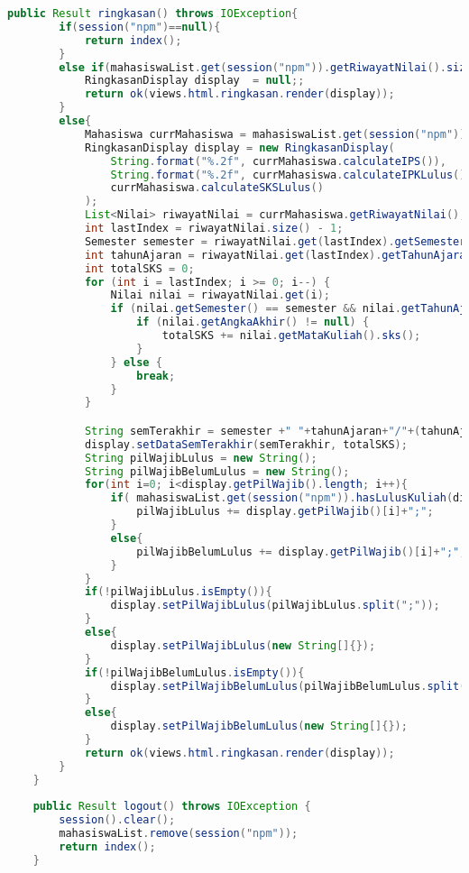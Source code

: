 \begin{lstlisting}[language=Java,basicstyle=\tiny,caption=Application.java]
    public Result ringkasan() throws IOException{
    	if(session("npm")==null){
    		return index();
    	}
    	else if(mahasiswaList.get(session("npm")).getRiwayatNilai().size()==0){
    		RingkasanDisplay display  = null;;
	    	return ok(views.html.ringkasan.render(display));
    	}
    	else{
    		Mahasiswa currMahasiswa = mahasiswaList.get(session("npm"));
    		RingkasanDisplay display = new RingkasanDisplay(
				String.format("%.2f", currMahasiswa.calculateIPS()), 
				String.format("%.2f", currMahasiswa.calculateIPKLulus()), 
				currMahasiswa.calculateSKSLulus()
			);
	    	List<Nilai> riwayatNilai = currMahasiswa.getRiwayatNilai();	
	    	int lastIndex = riwayatNilai.size() - 1;
			Semester semester = riwayatNilai.get(lastIndex).getSemester();
			int tahunAjaran = riwayatNilai.get(lastIndex).getTahunAjaran();
			int totalSKS = 0;
			for (int i = lastIndex; i >= 0; i--) {
				Nilai nilai = riwayatNilai.get(i);
				if (nilai.getSemester() == semester && nilai.getTahunAjaran() == tahunAjaran) {
					if (nilai.getAngkaAkhir() != null) {
						totalSKS += nilai.getMataKuliah().sks();
					}
				} else {
					break;
				}
			}

			String semTerakhir = semester +" "+tahunAjaran+"/"+(tahunAjaran+1);
	    	display.setDataSemTerakhir(semTerakhir, totalSKS);
    		String pilWajibLulus = new String();
	    	String pilWajibBelumLulus = new String();
    		for(int i=0; i<display.getPilWajib().length; i++){
	    		if( mahasiswaList.get(session("npm")).hasLulusKuliah(display.getPilWajib()[i])){
	    			pilWajibLulus += display.getPilWajib()[i]+";";
	    		}
	    		else{
	    			pilWajibBelumLulus += display.getPilWajib()[i]+";";
	    		}
	    	}
    		if(!pilWajibLulus.isEmpty()){
	    		display.setPilWajibLulus(pilWajibLulus.split(";"));
    		}
    		else{
    			display.setPilWajibLulus(new String[]{});
    		}
    		if(!pilWajibBelumLulus.isEmpty()){
	    		display.setPilWajibBelumLulus(pilWajibBelumLulus.split(";"));
    		}
    		else{
    			display.setPilWajibBelumLulus(new String[]{});
    		}
    		return ok(views.html.ringkasan.render(display));
    	}
    }
    
    public Result logout() throws IOException {
    	session().clear();
    	mahasiswaList.remove(session("npm"));
    	return index();
    }
    

\end{lstlisting}
